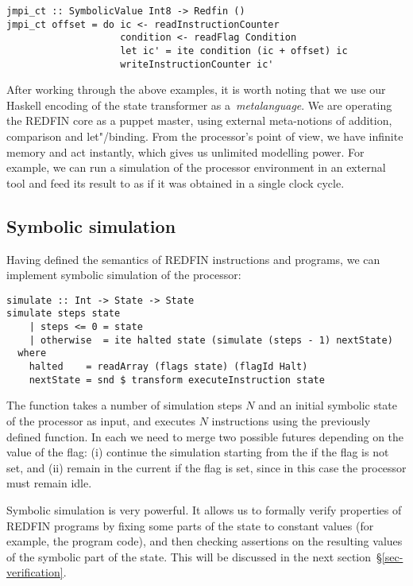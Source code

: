 \begin{verbatim}
jmpi_ct :: SymbolicValue Int8 -> Redfin ()
jmpi_ct offset = do ic <- readInstructionCounter
                    condition <- readFlag Condition
                    let ic' = ite condition (ic + offset) ic
                    writeInstructionCounter ic'
\end{verbatim}


\noindent
After working through the above examples, it is worth noting that we use our
Haskell encoding of the state transformer as a~\emph{metalanguage}. We are
operating the REDFIN core as a puppet master, using external
\pagebreak
meta-notions of addition,
comparison and let"/binding. From the processor's
point of view, we have infinite memory and act instantly, which gives us unlimited
modelling power. For example, we can run a simulation of the processor environment
in an external tool and feed its result to  as if it was
obtained in a single clock cycle.


\subsection{Symbolic simulation}

Having defined the semantics of REDFIN instructions and programs, we can
implement symbolic simulation of the processor:


\begin{verbatim}
simulate :: Int -> State -> State
simulate steps state
    | steps <= 0 = state
    | otherwise  = ite halted state (simulate (steps - 1) nextState)
  where
    halted    = readArray (flags state) (flagId Halt)
    nextState = snd $ transform executeInstruction state
\end{verbatim}


\noindent
The function takes a number of simulation steps $N$ and an initial symbolic
state of the processor as input, and executes $N$ instructions using the
previously defined  function. In each  we need
to merge two possible futures depending on the value of the  flag:
(i) continue the simulation starting from the  if the flag is not
set, and (ii) remain in the current  if the flag is set, since in
this case the processor must remain idle.

Symbolic simulation is very powerful. It allows us to formally verify properties
of REDFIN programs by fixing some parts of the state to constant values (for
example, the program code), and then checking assertions on the resulting values of
the symbolic part of the state. This will be discussed in the next
section~\S\ref{sec-verification}.

